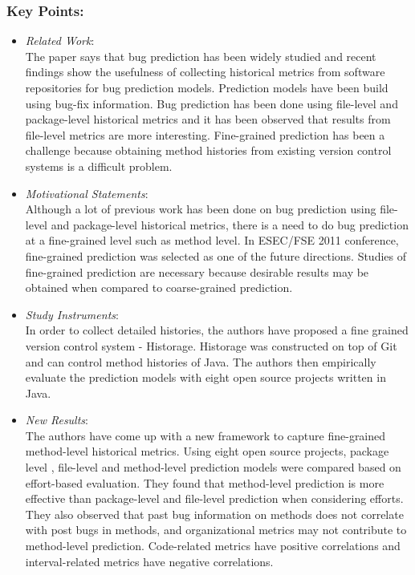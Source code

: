 \documentclass{sig-alternate-05-2015}
\begin{document}
\subsubsection{Key Points:}
\begin{itemize}
\item \emph{Related Work}: \\
The paper says that bug prediction has been widely studied and recent findings show the usefulness of collecting historical metrics from software repositories for bug prediction models. Prediction models have been build using bug-fix information. Bug prediction has been done using file-level and package-level historical metrics and it has been observed that results from file-level metrics are more interesting. Fine-grained prediction has been a challenge because obtaining method histories from existing version control systems is a difficult problem.
\item \emph{Motivational Statements}: \\
Although a lot of previous work has been done on bug prediction using file-level and package-level historical metrics, there is a need to do bug prediction at a fine-grained level such as method level. In ESEC/FSE 2011 conference, fine-grained prediction was selected as one of the future directions. Studies of fine-grained prediction are necessary because desirable results may be obtained when compared to coarse-grained prediction.
\item \emph{Study Instruments}: \\
In order to collect detailed histories, the authors have proposed a fine grained version control system - Historage. Historage was constructed on top of Git and can control method histories of Java. The authors then empirically evaluate the prediction models with eight open source projects written in Java.
\item \emph{New Results}: \\
The authors have come up with a new framework to capture fine-grained method-level historical metrics. Using eight open source projects, package level , file-level and method-level prediction models were compared based on effort-based evaluation. They found that method-level prediction is more effective than package-level and file-level prediction when considering efforts. They also observed that past bug information on methods does not correlate with post bugs in methods, and organizational metrics may not contribute to method-level prediction. Code-related metrics have positive correlations and interval-related metrics have negative correlations.
\end{itemize}
\end{document}
